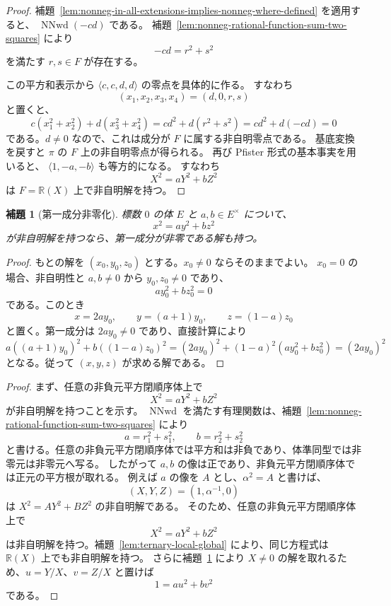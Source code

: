 \documentclass[uplatex,dvipdfmx]{jsarticle}
\newcommand{\Frac}{\mathbb{R}(X)}
\newcommand{\NNwd}{\operatorname{NNwd}}
\newcommand{\restateprefix}{}
\theoremstyle{matrixsosdefinition}
\newtheorem{lemma}[theorem]{補題}
\begin{document}
\begin{proof}
  補題~\ref{lem:nonneg-in-all-extensions-implies-nonneg-where-defined} を適用すると、
  \(\NNwd(-cd)\) である。
  補題~\ref{lem:nonneg-rational-function-sum-two-squares} により
  \[
    -cd = r^2+s^2
  \]
  を満たす \(r,s\in F\) が存在する。

  この平方和表示から \(\langle c,c,d,d\rangle\) の零点を具体的に作る。
  すなわち
  \[
    (x_1,x_2,x_3,x_4)=(d,0,r,s)
  \]
  と置くと、
  \[
    c(x_1^2+x_2^2)+d(x_3^2+x_4^2)
    =cd^2+d(r^2+s^2)=cd^2+d(-cd)=0
  \]
  である。\(d\ne0\) なので、これは成分が \(F\) に属する非自明零点である。
  基底変換を戻すと \(\pi\) の \(F\) 上の非自明零点が得られる。
  再び Pfister 形式の基本事実を用いると、
  \(\langle 1,-a,-b\rangle\) も等方的になる。
  すなわち
  \[
    X^2=aY^2+bZ^2
  \]
  は \(F=\Frac\) 上で非自明解を持つ。
\end{proof}

\begin{lemma}[第一成分非零化]\label{lem:first-coordinate-nonzero}
  標数 \(0\) の体 \(E\) と \(a,b\in E^\times\) について、
  \[
    x^2=a y^2+b z^2
  \]
  が非自明解を持つなら、第一成分が非零である解も持つ。
\end{lemma}

\begin{proof}
  もとの解を \((x_0,y_0,z_0)\) とする。\(x_0\ne0\) ならそのままでよい。
  \(x_0=0\) の場合、非自明性と \(a,b\ne0\) から \(y_0,z_0\ne0\) であり、
  \[
    a y_0^2+b z_0^2=0
  \]
  である。このとき
  \[
    x=2ay_0,\qquad y=(a+1)y_0,\qquad z=(1-a)z_0
  \]
  と置く。第一成分は \(2ay_0\ne0\) であり、直接計算により
  \[
    a((a+1)y_0)^2+b((1-a)z_0)^2
    =(2ay_0)^2+(1-a)^2(a y_0^2+b z_0^2)
    =(2ay_0)^2
  \]
  となる。従って \((x,y,z)\) が求める解である。
\end{proof}

{\renewcommand{\restateprefix}{再掲; }\binarySumTwoSquares*}

\begin{proof}
  まず、任意の非負元平方閉順序体上で
  \[
    X^2=aY^2+bZ^2
  \]
  が非自明解を持つことを示す。
  \(\NNwd\) を満たす有理関数は、補題~\ref{lem:nonneg-rational-function-sum-two-squares} により
  \[
    a=r_1^2+s_1^2,\qquad b=r_2^2+s_2^2
  \]
  と書ける。任意の非負元平方閉順序体では平方和は非負であり、体準同型では非零元は非零元へ写る。
  したがって \(a,b\) の像は正であり、非負元平方閉順序体では正元の平方根が取れる。
  例えば \(a\) の像を \(A\) とし、\(\alpha^2=A\) と書けば、
  \[
    (X,Y,Z)=(1,\alpha^{-1},0)
  \]
  は \(X^2=AY^2+BZ^2\) の非自明解である。
  そのため、任意の非負元平方閉順序体上で
  \[
    X^2=aY^2+bZ^2
  \]
  は非自明解を持つ。補題~\ref{lem:ternary-local-global} により、同じ方程式は \(\Frac\) 上でも非自明解を持つ。
  さらに補題~\ref{lem:first-coordinate-nonzero} により \(X\ne0\) の解を取れるため、\(u=Y/X\)、\(v=Z/X\) と置けば
  \[
    1=a u^2+b v^2
  \]
  である。
\end{proof}
\end{document}

